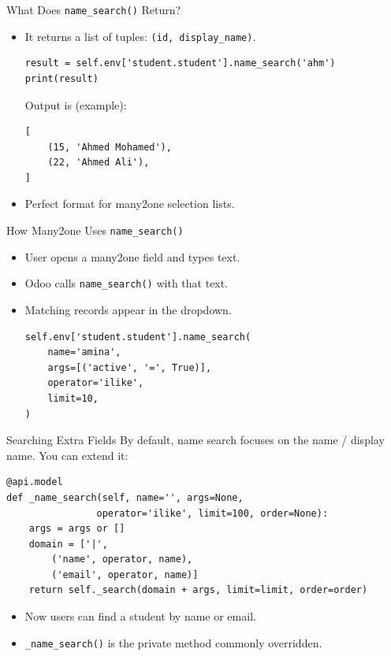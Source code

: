 \begin{frame}[fragile]{What Does \texttt{name\_search()} Return?}
	\begin{block}{}
		\begin{itemize}
			\item It returns a list of tuples: \texttt{(id, display\_name)}.
\begin{lstlisting}
result = self.env['student.student'].name_search('ahm')
print(result)
\end{lstlisting}
			Output is (example):
\begin{lstlisting}
[
	(15, 'Ahmed Mohamed'),
	(22, 'Ahmed Ali'),
]
\end{lstlisting}
			\item Perfect format for many2one selection lists.
		\end{itemize}
	\end{block}
\end{frame}

\begin{frame}[fragile]{How Many2one Uses \texttt{name\_search()}}
	\begin{itemize}
		\item User opens a many2one field and types text.
		\item Odoo calls \texttt{name\_search()} with that text.
		\item Matching records appear in the dropdown.
\begin{lstlisting}
self.env['student.student'].name_search(
	name='amina',
	args=[('active', '=', True)],
	operator='ilike',
	limit=10,
)
\end{lstlisting}
	\end{itemize}
\end{frame}

\begin{frame}[fragile]{Searching Extra Fields}
	By default, name search focuses on the name / display name.
	You can extend it:
\begin{lstlisting}
@api.model
def _name_search(self, name='', args=None,
				operator='ilike', limit=100, order=None):
	args = args or []
	domain = ['|',
		('name', operator, name),
		('email', operator, name)]
	return self._search(domain + args, limit=limit, order=order)
\end{lstlisting}
	\begin{itemize}
		\item Now users can find a student by name or email.
		\item \texttt{\_name\_search()} is the private method commonly overridden.
	\end{itemize}
\end{frame}

